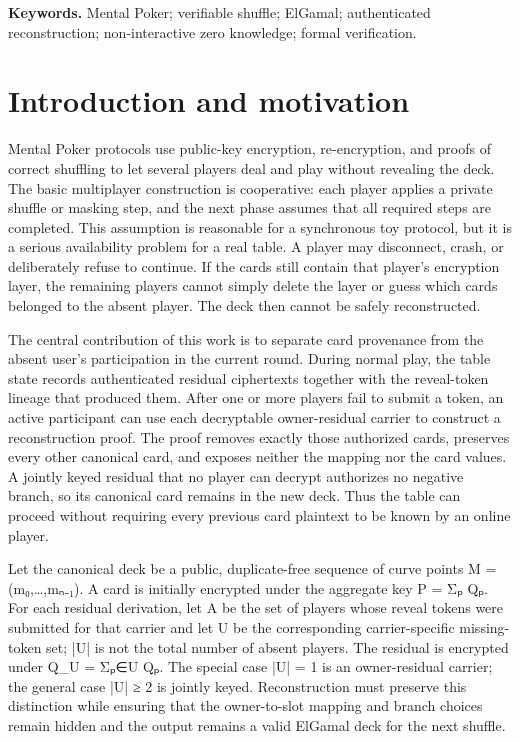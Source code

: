 \documentclass[11pt]{article}
\begin{document}
\noindent\textbf{Keywords.} Mental Poker; verifiable shuffle; ElGamal; authenticated reconstruction; non-interactive zero knowledge; formal verification.

\section{Introduction and motivation}

Mental Poker protocols use public-key encryption, re-encryption, and proofs of correct shuffling to let several players deal and play without revealing the deck. The basic multiplayer construction is cooperative: each player applies a private shuffle or masking step, and the next phase assumes that all required steps are completed. This assumption is reasonable for a synchronous toy protocol, but it is a serious availability problem for a real table. A player may disconnect, crash, or deliberately refuse to continue. If the cards still contain that player’s encryption layer, the remaining players cannot simply delete the layer or guess which cards belonged to the absent player. The deck then cannot be safely reconstructed.

The central contribution of this work is to separate card provenance from the absent user’s participation in the current round. During normal play, the table state records authenticated residual ciphertexts together with the reveal-token lineage that produced them. After one or more players fail to submit a token, an active participant can use each decryptable owner-residual carrier to construct a reconstruction proof. The proof removes exactly those authorized cards, preserves every other canonical card, and exposes neither the mapping nor the card values. A jointly keyed residual that no player can decrypt authorizes no negative branch, so its canonical card remains in the new deck. Thus the table can proceed without requiring every previous card plaintext to be known by an online player.

Let the canonical deck be a public, duplicate-free sequence of curve points M = (m₀,…,mₙ₋₁). A card is initially encrypted under the aggregate key P = Σₚ Qₚ. For each residual derivation, let A be the set of players whose reveal tokens were submitted for that carrier and let U be the corresponding carrier-specific missing-token set; |U| is not the total number of absent players. The residual is encrypted under Q\_U = Σₚ∈U Qₚ. The special case |U| = 1 is an owner-residual carrier; the general case |U| ≥ 2 is jointly keyed. Reconstruction must preserve this distinction while ensuring that the owner-to-slot mapping and branch choices remain hidden and the output remains a valid ElGamal deck for the next shuffle.
\end{document}

